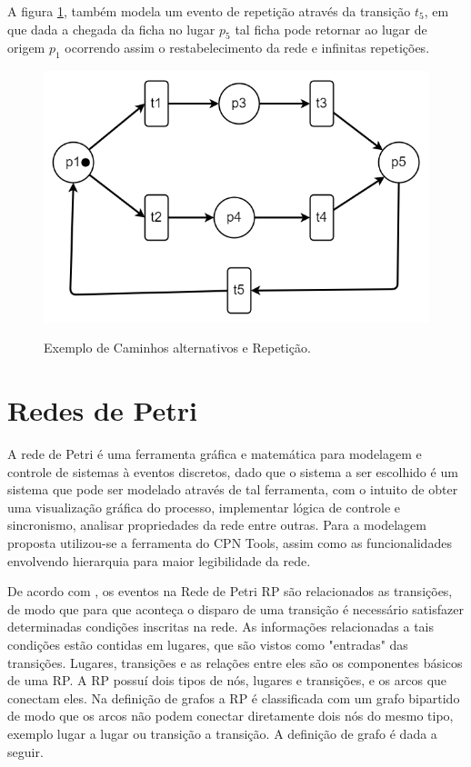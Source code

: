 A figura \ref{fig:caminhos_alternativos}, também modela um evento de repetição através da transição $t_5$, em que dada a chegada da ficha no lugar $p_5$ tal ficha pode retornar ao lugar de origem $p_1$ ocorrendo assim o restabelecimento da rede e infinitas repetições.

\begin{figure}[ht]
    \centering
    \caption{Exemplo de Caminhos alternativos e Repetição.}
    \includegraphics[scale=0.4]{figures/Petri/caminhos_alternativos.png}
    \label{fig:caminhos_alternativos}
\end{figure}

\section{Redes de Petri}
A rede de Petri é uma ferramenta gráfica e matemática para modelagem e controle de sistemas à eventos discretos, dado que o sistema a ser escolhido é um sistema que pode ser modelado através de tal ferramenta, com o intuito de obter uma visualização gráfica do processo, implementar lógica de controle e sincronismo, analisar propriedades da rede entre outras.
Para a modelagem proposta utilizou-se a ferramenta do CPN Tools, assim como as funcionalidades envolvendo hierarquia para maior legibilidade da rede.

De acordo com \cite{cassandras}, os eventos na Rede de Petri \gls{RP} são relacionados as transições, de modo que para que aconteça o disparo de uma transição é necessário satisfazer determinadas condições inscritas na rede.
As informações relacionadas a tais condições estão contidas em lugares, que são vistos como "entradas" das transições. Lugares, transições e as relações entre eles são os componentes básicos de uma RP. A RP possuí dois tipos de nós, lugares e transições, e os arcos que conectam eles. Na definição de grafos a RP é classificada com um grafo bipartido de modo que os arcos não podem conectar diretamente dois nós do mesmo tipo, exemplo lugar a lugar ou transição a transição.
A definição de grafo é dada a seguir.

